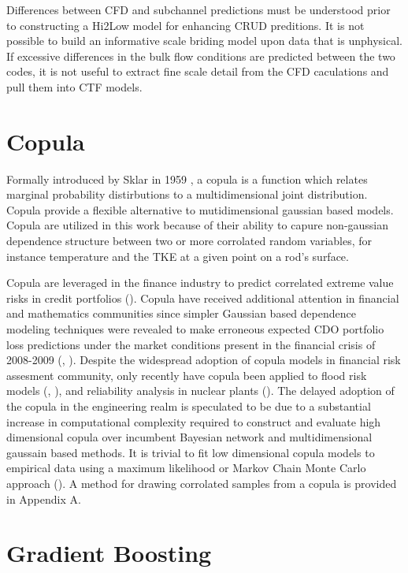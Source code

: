 Differences between CFD and subchannel predictions must be understood prior to constructing a Hi2Low model for enhancing CRUD preditions.  It is not possible to build an informative scale briding model upon data that is unphysical.  If excessive differences in the bulk flow conditions are predicted between the two codes, it is not useful to extract fine scale detail from the CFD caculations and pull them into CTF models. 

\section{Copula}

Formally introduced by Sklar in 1959 \citep{Sklar1959}, a copula is a function which relates marginal probability distirbutions to a multidimensional joint distribution.  Copula provide a flexible alternative to mutidimensional gaussian based models.  Copula are utilized in this work because of their ability to capure non-gaussian dependence structure between two or more corrolated random variables, for instance temperature and the TKE at a given point on a rod's surface.  

Copula are leveraged in the finance industry to
predict correlated extreme value risks in credit portfolios
(\citep{Geidosch2016}).  Copula have received additional attention in financial and mathematics communities since 
simpler Gaussian based dependence modeling techniques were revealed to make erroneous expected CDO portfolio loss predictions under the market conditions present in the financial crisis of
2008-2009 (\citep{MacKenzie2013}, \citep{Li2000}).  Despite the widespread adoption of copula models in financial risk assesment community, only recently have copula been applied to flood risk
models (\cite{Dupuis2007}, \cite{Ganguli2012}), and reliability analysis in nuclear plants
(\cite{Kelly2007}).  The delayed adoption of the copula in the
engineering realm is speculated to be due to a substantial increase in computational
complexity required to construct and evaluate high dimensional copula over
incumbent Bayesian network and multidimensional gaussain based methods.  
It is trivial to fit low dimensional copula models to empirical data
using a maximum likelihood or Markov Chain Monte Carlo approach (\cite{Jouini1996}).
A method for drawing corrolated samples from a copula is provided in Appendix A.

\section{Gradient Boosting}

